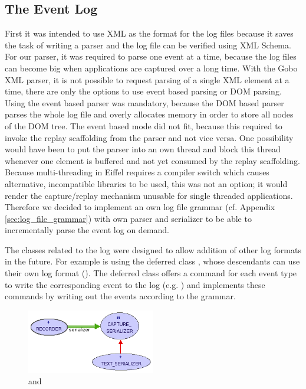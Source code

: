\subsection{The Event Log}
First it was intended to use XML as the format for the log files because it saves the task of writing a parser and the log file can be verified using XML Schema. For our parser, it was required to parse one event at a time, because the log files can become big when applications are captured over a long time. With the Gobo XML parser, it is not possible to request parsing of a single XML element at a time, there are only the options to use event based parsing or DOM parsing. Using the event based parser was mandatory, because the DOM based parser parses the whole log file and overly allocates memory in order to store all nodes of the DOM tree. The event based mode did not fit, because this required to invoke the replay scaffolding from the parser and not vice versa. One possibility would have been to put the parser into an own thread and block this thread whenever one element is buffered and not yet consumed by the replay scaffolding. Because multi-threading in Eiffel requires a compiler switch which causes alternative, incompatible libraries to be used, this was not an option; it would render the capture/replay mechanism unusable for single threaded applications.
Therefore we decided to implement an own log file grammar (cf. Appendix \ref{sec:log_file_grammar}) with own parser and serializer to be able to incrementally parse the event log on demand.


The classes related to the log were designed to allow addition of other log formats in the future. For example  is using the deferred class , whose descendants can use their own log format (). The deferred class offers a command for each event type to write the corresponding event to the log (e.g. ) and  implements these commands by writing out the events according to the grammar.

\begin{figure}[ht]
  \centering
  \includegraphics[width=0.5\textwidth]{illustrations/implementation_serializer.png}
  \caption{ and }
  \label{fig:implementation_serializer}
\end{figure}

